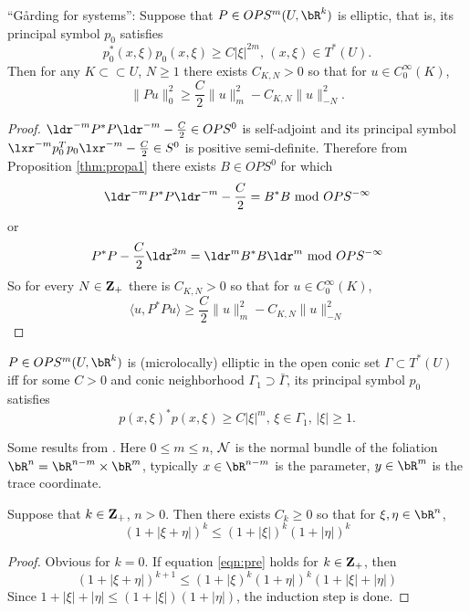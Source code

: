 \begin{theorem}
  \label{thm:garding}
  ``G\r{a}rding for systems'': Suppose that $P \in OPS^m(U,\bR^k)$ is elliptic, that is, its principal symbol $p_0$ satisfies 
\[
  p_0^*(x,\xi)p_0(x,\xi) \ge C|\xi|^{2m}, \, (x,\xi) \in T^*(U).
\]
Then for any $K \subset \subset U$, $N \ge 1$ there exists $C_{K,N} > 0$ so that for $u \in C^{\infty}_0(K)$, 
\[
  \|Pu\|^2_0 \ge \frac{C}{2}\|u\|^2_m - C_{K,N}\|u\|^2_{-N}.
\]
\end{theorem}

\begin{proof}
$\ldr^{-m}P^*P\ldr^{-m} - \frac{C}{2} \in OPS^0$ is self-adjoint  and its principal symbol $\lxr^{-m}p_0^Tp_0\lxr^{-m} - \frac{C}{2} \in S^0$ is positive semi-definite. Therefore from Proposition \ref{thm:propa1} there exists $B \in OPS^0$ for which
  \[
    \ldr^{-m}P^*P\ldr^{-m} - \frac{C}{2} = B^*B \mbox{ mod } OPS^{-\infty}
  \]
  or
  \[
    P^*P -\frac{C}{2} \ldr^{2m} = \ldr^m B^*B \ldr^m \mbox{ mod } OPS^{-\infty}
  \]
  So for every $N  \in {\bf Z}_+$ there is $C_{K,N} > 0$ so that for $u \in C_0^{\infty}(K)$,  
  \[
    \langle u,P^*P u \rangle \ge \frac{C}{2}\|u\|_m^2 -   C_{K,N}\|u\|^2_{-N}
  \]
  
\end{proof}

\begin{definition} $P \in OPS^m(U,\bR^k)$ is (microlocally) elliptic in the open conic set $\Gamma \subset T^*(U)$ iff for some $C>0$ and conic neighborhood $\Gamma_1 \supset \bar{\Gamma}$, its principal symbol $p_0$ satisfies
  \[
    p(x,\xi)^*p(x,\xi) \ge C|\xi|^m, \, \xi \in \Gamma_1, \, |\xi| \ge 1.
  \]
\end{definition}

Some results from \cite{BaoSy:91b}. Here $0 \le m \le n$, ${\cal N}$ is the normal bundle of the foliation $\bR^n = \bR^{n-m} \times \bR^m$, typically $x \in \bR^{n-m}$ is the parameter, $y \in \bR^m$ is the trace coordinate.

\begin{lemma}
\label{thm:prebao}
Suppose that $k \in {\bf Z}_+$, $n > 0$. Then there exists $C_{k} \ge 0$ so that for $\xi, \eta \in \bR^n$,
\begin{equation}
  \label{eqn:pre}
  (1 + |\xi + \eta|)^{k} \le (1 + |\xi|)^{k} (1 + |\eta|)^{k}
\end{equation}
\end{lemma}
\begin{proof}
  Obvious for $k = 0$. If equation \ref{eqn:pre} holds for $k \in {\bf Z}_+$, then
  \[
    (1 + |\xi + \eta|)^{k+1} \le (1 + |\xi)^{k}(1+ \eta|)^{k}(1+|\xi| + |\eta|)
  \]
  Since $1+|\xi| + |\eta| \le (1+|\xi|)(1 + |\eta|)$, the induction step is done.
\end{proof}

